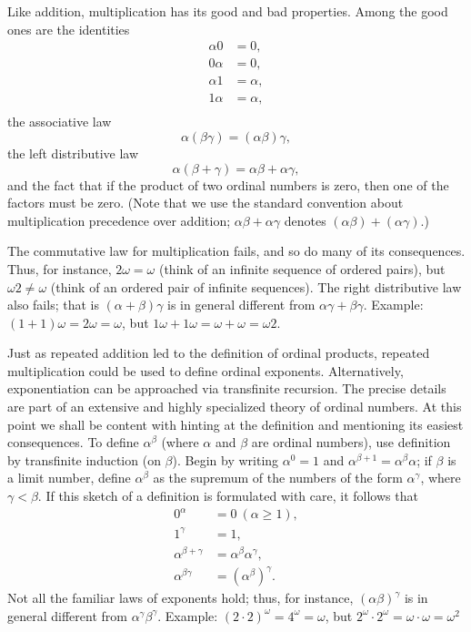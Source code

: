 Like addition, multiplication has its good and bad properties. Among the good ones are the identities 
\begin{align*}
\alpha 0 &= 0,\\
0 \alpha &= 0,\\
\alpha 1 &= \alpha ,\\
1 \alpha &= \alpha ,\\
\end{align*}
the associative law 
\begin{equation*}
\alpha ( \beta \gamma) = ( \alpha \beta ) \gamma , 
\end{equation*}
the left distributive law
\begin{equation*}
\alpha ( \beta  +\gamma) = \alpha \beta + \alpha \gamma , 
\end{equation*}
and the fact that if the product of two ordinal numbers is zero, then one of the factors must be zero. (Note that we use the standard convention about multiplication precedence over addition; $\alpha \beta + \alpha \gamma$ denotes $(\alpha \beta) + (\alpha \gamma)$.) 

The commutative law for multiplication fails, and so do many of its consequences. Thus, for instance, $2 \omega = \omega$ (think of an infinite sequence of ordered pairs), but $\omega 2 \neq \omega$ (think of an ordered pair of infinite sequences). The right distributive law also fails; that is $(\alpha + \beta) \gamma$ is in general different from $\alpha \gamma + \beta \gamma$. Example: $(1 + 1) \omega = 2 \omega = \omega$, but $1 \omega + 1 \omega = \omega + \omega = \omega 2$. 

Just as repeated addition led to the definition of ordinal products, repeated multiplication could be used to define ordinal exponents. Alternatively, exponentiation can be approached via transfinite recursion. The precise details are part of an extensive and highly specialized theory of ordinal numbers. At this point we shall be content with hinting at the definition and mentioning its easiest consequences. To define $\alpha^{\beta}$ (where $\alpha$ and $\beta$ are ordinal numbers), use definition by transfinite induction (on $\beta$). Begin by writing $\alpha^{0} = 1$ and $\alpha^{\beta + 1} = \alpha^{\beta} \alpha$; if $\beta$ is a limit number, define $\alpha^{\beta}$ as the supremum of the numbers of the form $\alpha^{\gamma}$, where $\gamma < \beta$. If this sketch of a definition is formulated with care, it follows that
\begin{align*}
0^{\alpha} &= 0\ (\alpha \ge 1),\\
1^{\gamma} &= 1,\\
\alpha^{\beta + \gamma} &= \alpha^{\beta} \alpha^{\gamma} ,\\
\alpha^{\beta \gamma} &= (\alpha^{\beta})^{\gamma}.
\end{align*}
Not all the familiar laws of exponents hold; thus, for instance, $( \alpha \beta)^{\gamma}$ is in general different from $\alpha^{\gamma} \beta^{\gamma}$. Example: $(2 \cdot 2)^{\omega} = 4^{\omega} = \omega$, but $2^{\omega} \cdot 2^{\omega} = \omega \cdot \omega =  \omega^{2}$ 

